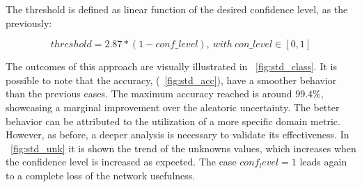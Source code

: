 The threshold is defined as linear function of the desired confidence level, as the previously:

\[
	threshold = 2.87 * (1 - conf \_ level), \ with \ con \_ level \in [0,1]
\]

The outcomes of this approach are visually illustrated in \Fig~\ref{fig:std_class}. It is possible to note that the accuracy, (\Fig~\ref{fig:std_acc}), have a smoother behavior than the previous cases. The maximum accuracy reached is around $99.4\%$, showcasing a marginal improvement over the aleatoric uncertainty. The better behavior can be attributed to the utilization of a more specific domain metric. However, as before, a deeper analysis is necessary to validate its effectiveness.
In \Fig~\ref{fig:std_unk} it is shown the trend of the unknowns values, which increases when the confidence level is increased as expected.
The case $conf_level=1$ leads again to a complete loss of the network usefulness.

